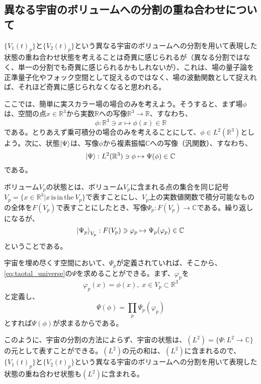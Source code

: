 \subsection{異なる宇宙のボリュームへの分割の重ね合わせについて}
$\{V_1(t)_p\}$と$\{V_2(t)_p\}$という異なる宇宙のボリュームへの分割を用いて表現した状態の重ね合わせ状態を考えることは奇異に感じられるが（異なる分割ではなく、単一の分割でも奇異に感じられるかもしれないが）、これは、場の量子論を正準量子化やフォック空間として捉えるのではなく、場の波動関数として捉えれば、それほど奇異に感じられなくなると思われる。\par
ここでは、簡単に実スカラー場の場合のみを考えよう。そうすると、まず場$\phi$は、空間の点$x \in \mathbb{R}^3$から実数$\mathbb{R}$への写像$\mathbb{R}^3 \to \mathbb{R}$、すなわち、
\begin{equation}
    \phi : \mathbb{R}^3 \ni x \mapsto \phi (x) \in \mathbb{R}
\end{equation}
である。とりあえず乗可積分の場合のみを考えることにして、$\phi \in L^2(\mathbb{R}^3)$としよう。次に、状態$\ket{\Psi}$は、写像$\phi$から複素振幅$\mathbb{C}$への写像（汎関数）、すなわち、
\begin{equation}
    \label{eq:taotal_universe}
    \ket{\Psi} :  L^2(\mathbb{R}^3) \ni \phi \mapsto \Psi (\phi) \in \mathbb{C}
\end{equation}
である。\par
ボリューム$V_p$の状態とは、ボリューム$V_p$に含まれる点の集合を同じ記号$V_p=\{x \in \mathbb{R}^3 | x \mathrm{\, is\, in\, the\, }V_p\}$で表すことにし、$V_p$上の実数値関数で積分可能なものの全体を$F(V_p)$で表すことにしたとき、写像$\Psi_p : F(V_p) \to \mathbb{C}$である。繰り返しになるが、
\begin{equation}
    \ket{\Psi_p}_{V_p} :  F(V_p) \ni \varphi_p \mapsto \Psi_p (\varphi_p) \in \mathbb{C}
\end{equation}
ということである。\par
宇宙を埋め尽くす空間において、$\Psi_p$が定義されていれば、そこから、\eqref{eq:taotal_universe}の$\Psi$を求めることができる。まず、$\varphi_p$を
\begin{equation}
     \varphi_p(x) = \phi(x),\; x \in V_p \subset \mathbb{R}^3
\end{equation}
と定義し、
\begin{equation}
    \Psi (\phi) = \prod_p \Psi_p(\varphi_p)
\end{equation}
とすれば$\Psi (\phi)$が求まるからである。\par
このように、宇宙の分割の方法によらず、宇宙の状態は、$(L^2) = \{\Psi : L^2 \to \mathbb{C}\}$の元として表すことができる。$(L^2)$の元の和は、$(L^2)$に含まれるので、$\{V_1(t)_p\}$と$\{V_2(t)_p\}$という異なる宇宙のボリュームへの分割を用いて表現した状態の重ね合わせ状態も$(L^2)$に含まれる。